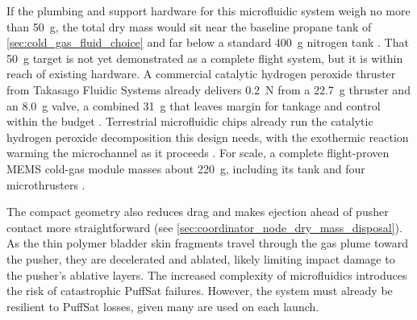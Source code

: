 \documentclass{article}
\begin{document}
If the plumbing and support hardware for this microfluidic system weigh no more than \SI{50}{\gram}, the total dry mass would sit near the baseline propane tank of \autoref{sec:cold_gas_fluid_choice} and far below a standard \SI{400}{\gram} nitrogen tank \cite{meyer_copv}. That \SI{50}{\gram} target is not yet demonstrated as a complete flight system, but it is within reach of existing hardware. A commercial catalytic hydrogen peroxide thruster from Takasago Fluidic Systems already delivers \SI{0.2}{\newton} from a \SI{22.7}{\gram} thruster and an \SI{8.0}{\gram} valve, a combined \SI{31}{\gram} that leaves margin for tankage and control within the budget \cite{takasago_h2o2_thruster}. Terrestrial microfluidic chips already run the catalytic hydrogen peroxide decomposition this design needs, with the exothermic reaction warming the microchannel as it proceeds \cite{yang2024microchannel}. For scale, a complete flight-proven MEMS cold-gas module masses about \SI{220}{\gram}, including its tank and four microthrusters \cite{nasa_soa_propulsion}. 

The compact geometry also reduces drag and makes ejection ahead of pusher contact more straightforward (see \autoref{sec:coordinator_node_dry_mass_disposal}). As the thin polymer bladder skin fragments travel through the gas plume toward the pusher, they are decelerated and ablated, likely limiting impact damage to the pusher's ablative layers. The increased complexity of microfluidics introduces the risk of catastrophic PuffSat failures. However, the system must already be resilient to PuffSat losses, given many are used on each launch.
\end{document}
